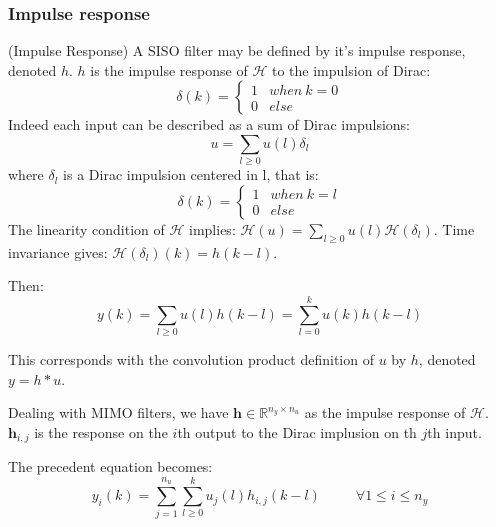 	\subsubsection{Impulse response}
		\begin{thdef}\label{impresp} (Impulse Response)
			A SISO filter may be defined by it's impulse response, denoted $h$.
			$h$ is the impulse response of $\mathcal{H}$ to the impulsion of Dirac:
			\begin{equation} \label{ir}
					\delta(k)=
					\begin{cases}
						1 & when\  k=0 \\
						0 & else
					\end{cases}
			\end{equation}
			Indeed each input can be described as a sum of Dirac impulsions:
			\begin{equation} \label{dri}
				u = \sum_{l \geq 0}u(l)\delta_l
			\end{equation}
			where $\delta_l$ is a Dirac impulsion centered in l, that is:
			\begin{equation} \label{dirc}
					\delta(k)=
					\begin{cases}
						1 & when\  k=l \\
						0 & else
					\end{cases}
			\end{equation}
			The linearity condition of $\mathcal{H}$ implies:
			$\mathcal{H}(u)=\sum_{l \geq 0}u(l)\mathcal{H}(\delta_l)$.
			Time invariance gives: $\mathcal{H}(\delta_l)(k)=h(k-l)$.

			Then:
			\begin{equation} \label{convo}
				y(k) = \sum_{l \geq 0}u(l)h(k-l)= \sum_{l=0}^{k}u(k)h(k-l)
			\end{equation}

			This corresponds with the convolution product definition of $u$ by $h$,
			denoted $y= h * u$.

			Dealing with MIMO filters, we have $\boldsymbol{h} \in \mathbb{R}^{n_y \times n_u}$ as the impulse response of $\mathcal{H}$.
			$\boldsymbol{h}_{i,j}$ is the response on the $i$th output to the Dirac implusion on th $j$th input.

			The precedent equation becomes:
			\begin{equation} \label{convomimo}
					y_i(k) = \sum_{j=1}^{n_u}\sum_{l \geq 0}^{k}u_j(l)h_{i,j}(k-l) \hspace{30pt} \forall 1\leq i \leq n_y
			\end{equation}


				
		\end{thdef}
